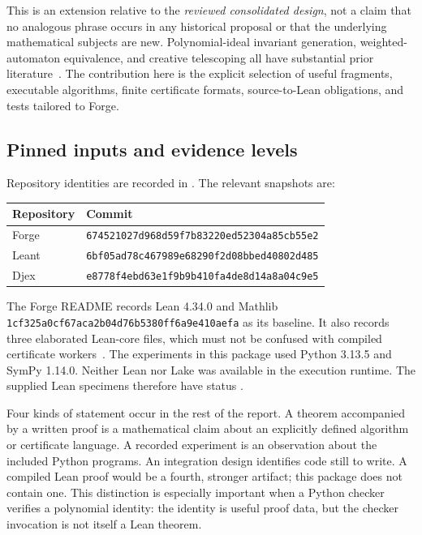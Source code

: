 This is an extension relative to the \emph{reviewed consolidated design}, not a
claim that no analogous phrase occurs in any historical proposal or that the
underlying mathematical subjects are new. Polynomial-ideal invariant generation,
weighted-automaton equivalence, and creative telescoping all have substantial
prior literature~\cite{sankaranarayanan,kiefer,brochet}. The contribution here is
the explicit selection of useful fragments, executable algorithms, finite
certificate formats, source-to-Lean obligations, and tests tailored to Forge.

\subsection{Pinned inputs and evidence levels}

Repository identities are recorded in . The relevant
snapshots are:
\begin{center}
\begin{tabular}{@{}ll@{}}\toprule
Repository & Commit \\\midrule
Forge & \texttt{674521027d968d59f7b83220ed52304a85cb55e2} \\
Leant & \texttt{6bf05ad78c467989e68290f2d08bbed40802d485} \\
Djex & \texttt{e8778f4ebd63e1f9b9b410fa4de8d14a8a04c9e5} \\
\bottomrule\end{tabular}
\end{center}
The Forge README records Lean 4.34.0 and Mathlib
\texttt{1cf325a0cf67aca2b04d76b5380ff6a9e410aefa} as its baseline. It also records
three elaborated Lean-core files, which must not be confused with compiled
certificate workers~\cite{forge}. The experiments in this package used Python
3.13.5 and SymPy 1.14.0. Neither Lean nor Lake was available in the execution
runtime. The supplied Lean specimens therefore have status .

Four kinds of statement occur in the rest of the report. A theorem accompanied
by a written proof is a mathematical claim about an explicitly defined
algorithm or certificate language. A recorded experiment is an observation
about the included Python programs. An integration design identifies code still
to write. A compiled Lean proof would be a fourth, stronger artifact; this
package does not contain one. This distinction is especially important when a
Python checker verifies a polynomial identity: the identity is useful proof
data, but the checker invocation is not itself a Lean theorem.

